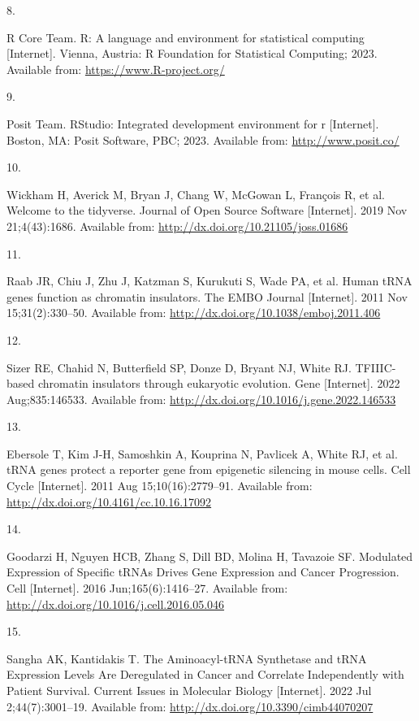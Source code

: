 \documentclass[
  12pt,
]{article}
\newlength{\cslhangindent}
\newlength{\csllabelwidth}
\newlength{\cslentryspacingunit} %
\newenvironment{CSLReferences}[2] %
 {%
  \setlength{\parindent}{0pt}
  \ifodd #1
  \let\oldpar\par
  \def\par{\hangindent=\cslhangindent\oldpar}
  \fi
  \setlength{\parskip}{#2\cslentryspacingunit}
 }%
 {}
\newcommand{\CSLLeftMargin}[1]{\parbox[t]{\csllabelwidth}{#1}}
\newcommand{\CSLRightInline}[1]{\parbox[t]{\linewidth - \csllabelwidth}{#1}\break}
\begin{document}
\begin{CSLReferences}{0}{0}
\leavevmode{}%
\CSLLeftMargin{8. }%
\CSLRightInline{R Core Team. R: A language and environment for statistical computing {[}Internet{]}. Vienna, Austria: R Foundation for Statistical Computing; 2023. Available from: \url{https://www.R-project.org/}}

\leavevmode{}%
\CSLLeftMargin{9. }%
\CSLRightInline{Posit Team. RStudio: Integrated development environment for r {[}Internet{]}. Boston, MA: Posit Software, PBC; 2023. Available from: \url{http://www.posit.co/}}

\leavevmode{}%
\CSLLeftMargin{10. }%
\CSLRightInline{Wickham H, Averick M, Bryan J, Chang W, McGowan L, François R, et al. Welcome to the tidyverse. Journal of Open Source Software {[}Internet{]}. 2019 Nov 21;4(43):1686. Available from: \url{http://dx.doi.org/10.21105/joss.01686}}

\leavevmode{}%
\CSLLeftMargin{11. }%
\CSLRightInline{Raab JR, Chiu J, Zhu J, Katzman S, Kurukuti S, Wade PA, et al. Human tRNA genes function as chromatin insulators. The EMBO Journal {[}Internet{]}. 2011 Nov 15;31(2):330--50. Available from: \url{http://dx.doi.org/10.1038/emboj.2011.406}}

\leavevmode{}%
\CSLLeftMargin{12. }%
\CSLRightInline{Sizer RE, Chahid N, Butterfield SP, Donze D, Bryant NJ, White RJ. TFIIIC-based chromatin insulators through eukaryotic evolution. Gene {[}Internet{]}. 2022 Aug;835:146533. Available from: \url{http://dx.doi.org/10.1016/j.gene.2022.146533}}

\leavevmode{}%
\CSLLeftMargin{13. }%
\CSLRightInline{Ebersole T, Kim J-H, Samoshkin A, Kouprina N, Pavlicek A, White RJ, et al. tRNA genes protect a reporter gene from epigenetic silencing in mouse cells. Cell Cycle {[}Internet{]}. 2011 Aug 15;10(16):2779--91. Available from: \url{http://dx.doi.org/10.4161/cc.10.16.17092}}

\leavevmode{}%
\CSLLeftMargin{14. }%
\CSLRightInline{Goodarzi H, Nguyen HCB, Zhang S, Dill BD, Molina H, Tavazoie SF. Modulated Expression of Specific tRNAs Drives Gene Expression and Cancer Progression. Cell {[}Internet{]}. 2016 Jun;165(6):1416--27. Available from: \url{http://dx.doi.org/10.1016/j.cell.2016.05.046}}

\leavevmode{}%
\CSLLeftMargin{15. }%
\CSLRightInline{Sangha AK, Kantidakis T. The Aminoacyl-tRNA Synthetase and tRNA Expression Levels Are Deregulated in Cancer and Correlate Independently with Patient Survival. Current Issues in Molecular Biology {[}Internet{]}. 2022 Jul 2;44(7):3001--19. Available from: \url{http://dx.doi.org/10.3390/cimb44070207}}

\end{CSLReferences}
\end{document}
